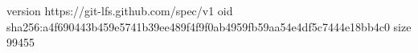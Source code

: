 version https://git-lfs.github.com/spec/v1
oid sha256:a4f690443b459e5741b39ee489f4f9f0ab4959fb59aa54e4df5c7444e18bb4c0
size 99455
